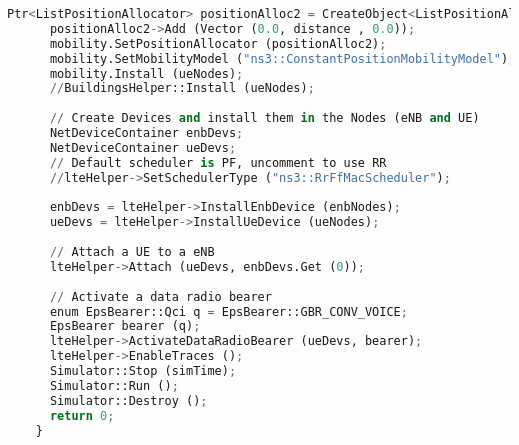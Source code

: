 \begin{lstlisting}[language=Python, label=py_script, basicstyle=\fontsize{10.5}{12.5}\selectfont]
	  Ptr<ListPositionAllocator> positionAlloc2 = CreateObject<ListPositionAllocator> ();
	  positionAlloc2->Add (Vector (0.0, distance , 0.0)); 
	  mobility.SetPositionAllocator (positionAlloc2);
	  mobility.SetMobilityModel ("ns3::ConstantPositionMobilityModel");
	  mobility.Install (ueNodes);
	  //BuildingsHelper::Install (ueNodes);
		
	  // Create Devices and install them in the Nodes (eNB and UE)
	  NetDeviceContainer enbDevs;
	  NetDeviceContainer ueDevs;
	  // Default scheduler is PF, uncomment to use RR
	  //lteHelper->SetSchedulerType ("ns3::RrFfMacScheduler");
	
	  enbDevs = lteHelper->InstallEnbDevice (enbNodes);
	  ueDevs = lteHelper->InstallUeDevice (ueNodes);
	
	  // Attach a UE to a eNB
	  lteHelper->Attach (ueDevs, enbDevs.Get (0));
	
	  // Activate a data radio bearer
	  enum EpsBearer::Qci q = EpsBearer::GBR_CONV_VOICE;
	  EpsBearer bearer (q);
	  lteHelper->ActivateDataRadioBearer (ueDevs, bearer);
	  lteHelper->EnableTraces ();
	  Simulator::Stop (simTime);
	  Simulator::Run ();
	  Simulator::Destroy ();
	  return 0;
	}

\end{lstlisting}

